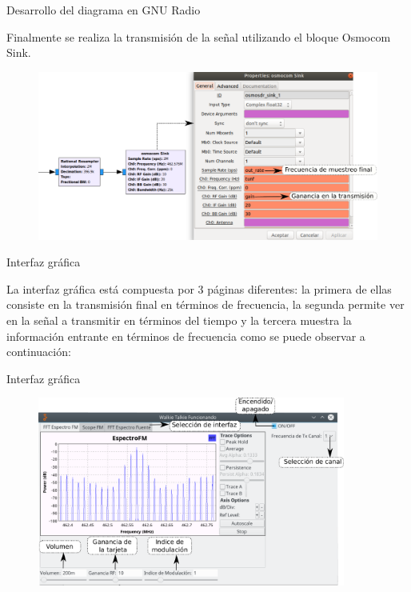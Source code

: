 \begin{frame}{Desarrollo del diagrama en GNU Radio}

Finalmente se realiza la transmisión de la señal utilizando el bloque Osmocom Sink.

\begin{figure}[H]
\centering
\vspace{-3mm}
\includegraphics[width=\textwidth]{parte3/lab14/pdf/Lab14_8.pdf}
\end{figure}

\end{frame}

\begin{frame}{Interfaz gráfica}

La interfaz gráfica está compuesta por 3 páginas diferentes: la primera de ellas consiste en la transmisión final en términos de frecuencia, la segunda permite ver en la señal a transmitir en términos del tiempo y la tercera muestra la información entrante en términos de frecuencia como se puede observar a continuación:

\end{frame}

\begin{frame}{Interfaz gráfica}

\begin{figure}[H]
\centering
\vspace{-3mm}
\includegraphics[width=0.9\textwidth]{parte3/lab14/pdf/Lab14_9.pdf}
\end{figure}

\end{frame}

